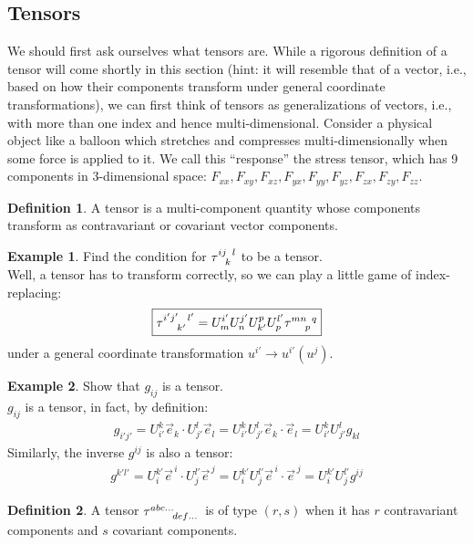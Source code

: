 \documentclass{book}
\theoremstyle{definition}
\newtheorem{defn}{Definition}[section]
\newtheorem{exmp}{Example}[section]
\begin{document}
\subsection{Tensors}
We should first ask ourselves what tensors are. While a rigorous definition of a tensor will come shortly in this section (hint: it will resemble that of a vector, i.e., based on how their components transform under general coordinate transformations), we can first think of tensors as generalizations of vectors, i.e., with more than one index and hence multi-dimensional. Consider a physical object like a balloon which stretches and compresses multi-dimensionally when some force is applied to it. We call this ``response'' the stress tensor, which has 9 components in 3-dimensional space: $F_{xx}, F_{xy}, F_{xz}, F_{yx}, F_{yy}, F_{yz}, F_{zx}, F_{zy}, F_{zz}$.  
\begin{defn}
	A tensor is a multi-component quantity whose components transform as contravariant or covariant vector components.
\end{defn}
\begin{exmp}
	Find the condition for $\tensor{\tau}{^{ij}_k^l}$ to be a tensor.\\
	
	Well, a tensor has to transform correctly, so we can play a little game of index-replacing:
	\begin{align*}
	\boxed{\tensor{\tau}{^{i'j'}_{k'}^{l'}} = U^{i'}_mU^{j'}_nU^p_{k'}U^{l'}_p\tensor{\tau}{^{mn}_{p}^{q}}}
	\end{align*}
	under a general coordinate transformation $u^{i'} \rightarrow u^{i'}(u^j)$. 
\end{exmp}
\begin{exmp}
	Show that $g_{ij}$ is a tensor.\\
	
	$g_{ij}$ is a tensor, in fact, by definition:
	\begin{align*}
	\boxed{g_{i'j'} = U^k_{i'}\vec{e}_k \cdot U^l_{j'}\vec{e}_l = U^k_{i'}U^l_{j'}\vec{e}_k \cdot\vec{e}_l = U^k_{i'}U^l_{j'}g_{kl}}
	\end{align*} 
	Similarly, the inverse $g^{ij}$ is also a tensor:
	\begin{align*}
	\boxed{g^{k'l'} = U^{k'}_{i}\vec{e}^{\,i} \cdot U^{l'}_{j}\vec{e}^{\,j} = U^{k'}_iU^{l'}_{j}\vec{e}^{\,i} \cdot\vec{e}^{\,j} = U^{k'}_{i}U^{l'}_{j}g^{ij}}
	\end{align*}
\end{exmp}
\begin{defn}
	A tensor $\tensor{\tau}{^{abc\dots}_{def\dots}}$ is of type $(r,s)$ when it has $r$ contravariant components and $s$ covariant components. 
\end{defn}
\end{document}
